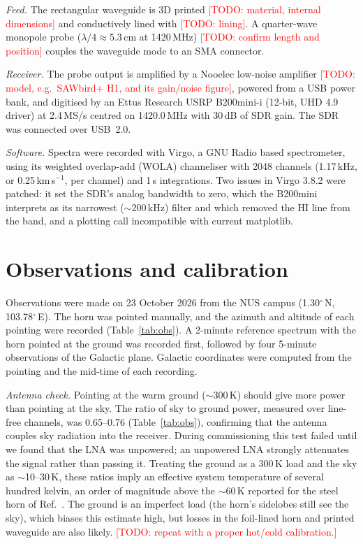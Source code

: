 \documentclass[aip,apl,reprint,amsmath,amssymb]{revtex4-2}
\newcommand{\todo}[1]{\textcolor{red}{[TODO: #1]}}
\newcommand{\kms}{km\,s$^{-1}$}
\begin{document}
\textit{Feed.} The rectangular waveguide is 3D printed \todo{material, internal dimensions} and conductively lined with \todo{lining}. A quarter-wave monopole probe ($\lambda/4 \approx 5.3$\,cm at 1420\,MHz) \todo{confirm length and position} couples the waveguide mode to an SMA connector.

\textit{Receiver.} The probe output is amplified by a Nooelec low-noise amplifier \todo{model, e.g.\ SAWbird+ H1, and its gain/noise figure}, powered from a USB power bank, and digitised by an Ettus Research USRP B200mini-i (12-bit, UHD 4.9 driver) at 2.4\,MS/s centred on 1420.0\,MHz with 30\,dB of SDR gain. The SDR was connected over USB~2.0.

\textit{Software.} Spectra were recorded with Virgo,\cite{Virgo} a GNU Radio based spectrometer, using its weighted overlap-add (WOLA) channeliser with 2048 channels (1.17\,kHz, or 0.25\,\kms, per channel) and 1\,s integrations. Two issues in Virgo 3.8.2 were patched: it set the SDR's analog bandwidth to zero, which the B200mini interprets as its narrowest ($\sim$200\,kHz) filter and which removed the HI line from the band, and a plotting call incompatible with current matplotlib.

\section{Observations and calibration}

Observations were made on 23 October 2026 from the NUS campus (1.30$^\circ$\,N, 103.78$^\circ$\,E). The horn was pointed manually, and the azimuth and altitude of each pointing were recorded (Table~\ref{tab:obs}). A 2-minute reference spectrum with the horn pointed at the ground was recorded first, followed by four 5-minute observations of the Galactic plane. Galactic coordinates were computed from the pointing and the mid-time of each recording.

\textit{Antenna check.} Pointing at the warm ground ($\sim$300\,K) should give more power than pointing at the sky. The ratio of sky to ground power, measured over line-free channels, was 0.65--0.76 (Table~\ref{tab:obs}), confirming that the antenna couples sky radiation into the receiver. During commissioning this test failed until we found that the LNA was unpowered; an unpowered LNA strongly attenuates the signal rather than passing it. Treating the ground as a 300\,K load and the sky as $\sim$10--30\,K, these ratios imply an effective system temperature of several hundred kelvin, an order of magnitude above the $\sim$60\,K reported for the steel horn of Ref.~. The ground is an imperfect load (the horn's sidelobes still see the sky), which biases this estimate high, but losses in the foil-lined horn and printed waveguide are also likely. \todo{repeat with a proper hot/cold calibration.}
\end{document}
